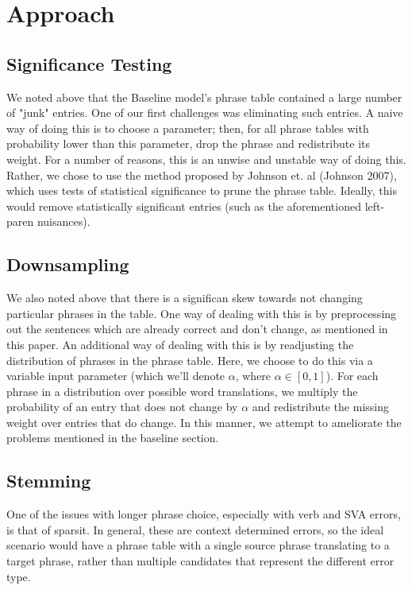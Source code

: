 \documentclass[11pt,letterpaper]{article}
\begin{document}
\section{Approach}
\subsection{Significance Testing}
\indent We noted above that the Baseline model's phrase table contained a large number of "junk" entries.
One of our first challenges was eliminating such entries. A naive way of doing this is to choose a parameter; then, for all 
phrase tables with probability lower than this parameter, drop the phrase and redistribute its weight. For a 
number of reasons, this is an unwise and unstable way of doing this. Rather, we chose to use the method
 proposed by Johnson et. al (Johnson 2007), which uses tests of statistical significance to prune the phrase table. 
 Ideally, this would remove statistically significant entries (such as the aforementioned left-paren nuisances). \newline
\subsection{Downsampling}
\indent We also noted above that there is a significan skew towards not changing particular phrases in the table. One way of
 dealing with this is by preprocessing out the sentences which are already correct and don't change, as mentioned in this paper. 
 An additional way of dealing with this is by readjusting the distribution of phrases in the phrase table. Here, we choose to
  do this via a variable input parameter (which we'll denote $\alpha$, where $\alpha \in [0,1]$). For each phrase in
   a distribution over possible word translations, we multiply the probability  of an entry that does not change by $\alpha$ 
   and redistribute the missing weight over entries that do change. In this manner, we attempt to ameliorate the problems 
   mentioned in the baseline section. \newline
\subsection{Stemming}


One of the issues with longer phrase choice, especially with verb and SVA errors, is that of sparsit. In general, these are context determined errors, so the ideal scenario would have a phrase table with a single source phrase translating to a target phrase, rather than multiple candidates that represent the different error type. 
\end{document}
